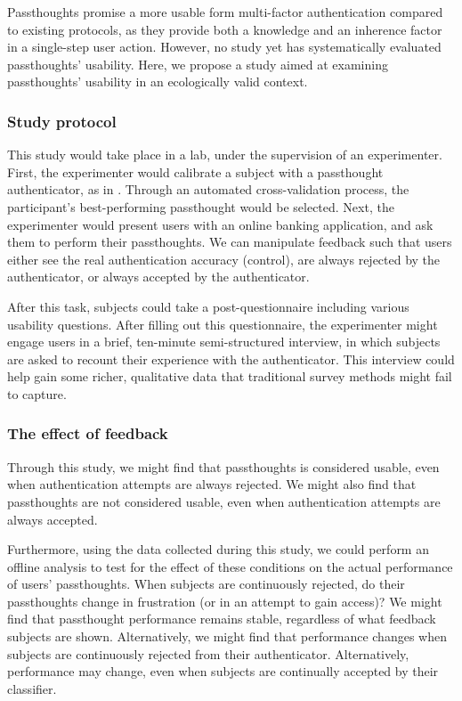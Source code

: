 \documentclass[sigconf]{acmart}
\begin{document}
Passthoughts promise a more usable form multi-factor authentication compared to existing protocols,
as they provide both a knowledge and an inherence factor in a single-step user action.
However, no study yet has systematically evaluated passthoughts' usability.
Here, we propose a study aimed at examining passthoughts' usability in an ecologically valid context.

\subsubsection{Study protocol}
\label{sec:org91fd7ba}

This study would take place in a lab, under the supervision of an experimenter.
First, the experimenter would calibrate a subject with a passthought authenticator, as in \cite{Chuang2013b}.
Through an automated cross-validation process, the participant's best-performing passthought would be selected.
Next, the experimenter would present users with an online banking application, and ask them to perform their passthoughts.
We can manipulate feedback such that users either see the real authentication accuracy (control), 
are always rejected by the authenticator, 
or always accepted by the authenticator.

After this task, subjects could take a post-questionnaire including various usability questions.
After filling out this questionnaire, the experimenter might engage users in a brief, ten-minute semi-structured interview,
in which subjects are asked to recount their experience with the authenticator.
This interview could help gain some richer, qualitative data that traditional survey methods might fail to capture.

\subsubsection{The effect of feedback}
\label{sec:org83db71d}

Through this study, we might find 
that passthoughts is considered usable, even when authentication attempts are always rejected.
We might also find that passthoughts are not considered usable, 
even when authentication attempts are always accepted.

Furthermore, using the data collected during this study, we could perform an offline analysis 
to test for the effect of these conditions on the actual performance of users' passthoughts.
When subjects are continuously rejected, do their passthoughts change in frustration (or in an attempt to gain access)?
We might find that passthought performance 
remains stable, regardless of what feedback subjects are shown.
Alternatively, we might find that performance changes 
when subjects are continuously rejected from their authenticator.
Alternatively, performance may change, 
even when subjects are continually accepted by their classifier.
\end{document}
